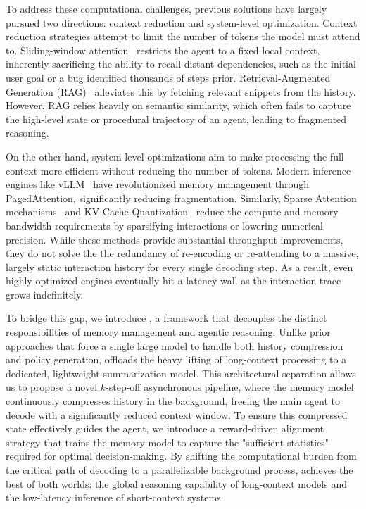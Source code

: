 To address these computational challenges, previous solutions have largely pursued two directions: context reduction and system-level optimization.
Context reduction strategies attempt to limit the number of tokens the model must attend to. Sliding-window attention~\citep{fu2025slidingwindowattentiontraining} restricts the agent to a fixed local context, inherently sacrificing the ability to recall distant dependencies, such as the initial user goal or a bug identified thousands of steps prior. Retrieval-Augmented Generation (RAG)~\cite{wu2025longmemevalbenchmarkingchatassistants,shi2026lookreasonforwardrevisitable} alleviates this by fetching relevant snippets from the history. However, RAG relies heavily on semantic similarity, which often fails to capture the high-level state or procedural trajectory of an agent, leading to fragmented reasoning.

On the other hand, system-level optimizations aim to make processing the full context more efficient without reducing the number of tokens. Modern inference engines like vLLM~\cite{kwon2023efficientmemorymanagementlarge} have revolutionized memory management through PagedAttention, significantly reducing fragmentation. Similarly, Sparse Attention mechanisms~\cite{xiao2024efficientstreaminglanguagemodels} and KV Cache Quantization~\cite{hooper2025kvquant10millioncontext} reduce the compute and memory bandwidth requirements by sparsifying interactions or lowering numerical precision.
While these methods provide substantial throughput improvements, they do not solve the the redundancy of re-encoding or re-attending to a massive, largely static interaction history for every single decoding step. As a result, even highly optimized engines eventually hit a latency wall as the interaction trace grows indefinitely.

To bridge this gap, we introduce \model, a framework that decouples the distinct responsibilities of memory management and agentic reasoning. Unlike prior approaches that force a single large model to handle both history compression and policy generation, \model offloads the heavy lifting of long-context processing to a dedicated, lightweight summarization model. This architectural separation allows us to propose a novel $k$-step-off asynchronous pipeline, where the memory model continuously compresses history in the background, freeing the main agent to decode with a significantly reduced context window. To ensure this compressed state effectively guides the agent, we introduce a reward-driven alignment strategy that trains the memory model to capture the "sufficient statistics" required for optimal decision-making. By shifting the computational burden from the critical path of decoding to a parallelizable background process, \model achieves the best of both worlds: the global reasoning capability of long-context models and the low-latency inference of short-context systems.

